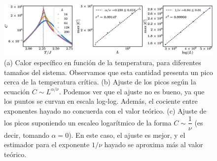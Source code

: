 \documentclass[10pt]{article}
\begin{document}
\begin{enumerate}[a)]
\begin{figure}[ht]
\centering
\includegraphics[scale=0.27]{Fig11.pdf}
\caption{(a) Calor específico en función de la temperatura, para diferentes tamaños del sistema. Observamos que esta cantidad presenta un pico cerca de la temperatura crítica. (b) Ajuste de los picos según la ecuación $C \sim L^{\alpha / \nu}$. Podemos ver que el ajuste no es bueno, ya que los puntos se curvan en escala log-log. Además, el cociente entre exponentes hayado no concuerda con el valor teórico. (c) Ajuste de los picos suponiendo un escaleo logarítmico de la forma $C \sim \dfrac{1}{\nu}$ (es decir, tomando $\alpha = 0$). En este caso, el ajuste es mejor, y el estimador para el exponente $1/\nu$ hayado se aproxima más al valor teórico.}
\end{figure}

\end{enumerate}
\end{document}
